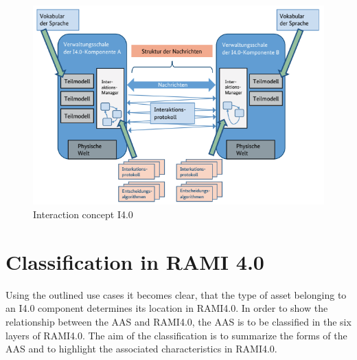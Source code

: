 \begin{figure}[h]
\centering
\includegraphics[scale=0.7]{content/pictures/interaction_i40_components.png}
\caption{Interaction concept \ac{I4.0}}
\label{fig:interaction-concept-i40}
\end{figure}

\section{Classification in RAMI 4.0}

Using the outlined use cases it becomes clear, that the type of asset belonging to an \ac{I4.0} component determines its location in \ac{RAMI4.0}. In order to show the relationship between the \ac{AAS} and \ac{RAMI4.0}, the \ac{AAS} is to be classified in the six layers of \ac{RAMI4.0}. The aim of the classification is to summarize the forms of the \ac{AAS} and to highlight the associated characteristics in \ac{RAMI4.0}.

